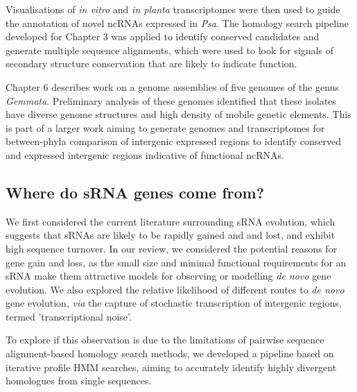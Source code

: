 Visualisations of \textit{in vitro} and \textit{in planta} transcriptomes were then used to guide the annotation of novel ncRNAs expressed in \textit{Psa}. The homology search pipeline developed for Chapter 3 was applied to identify conserved candidates and generate multiple sequence alignments, which were used to look for signals of secondary structure conservation that are likely to indicate function.

Chapter 6 describes work on a genome assemblies of five genomes of the genus \textit{Gemmata}. Preliminary analysis of these genomes identified that these isolates have diverse genome structures and high density of mobile genetic elements. This is part of a larger work aiming to generate genomes and transcriptomes for between-phyla comparison of intergenic expressed regions to identify conserved and expressed intergenic regions indicative of functional ncRNAs. 
\subsection{Where do sRNA genes come from?}

We first considered the current literature surrounding sRNA evolution, which suggests that sRNAs are likely to be rapidly gained and and lost, and exhibit high sequence turnover. In our review, we considered the potential reasons for gene gain and loss, as the small size and minimal functional requirements for an sRNA make them attractive models for observing or modelling \textit{de novo} gene evolution. We also explored the relative likelihood of different routes to \textit{de novo} gene evolution, \textit{via} the capture of stochastic transcription of intergenic regions, termed 'transcriptional noise'. 

To explore if this observation is due to the limitations of pairwise sequence alignment-based homology search methods, we developed a pipeline based on iterative profile HMM searches, aiming to accurately identify highly divergent homologues from single sequences.

